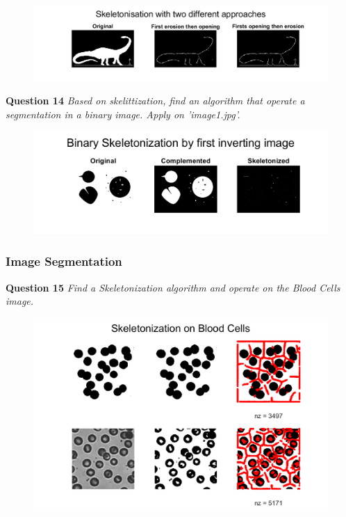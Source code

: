 \begin{figure}[H]
    \centering
    \includegraphics[width=\linewidth]{Doc/Graphics/Part2/part2_Q13.png}
\end{figure}


\textbf{Question 14} \textit{Based on skelittization, ﬁnd an algorithm that operate a segmentation in a binary image. Apply on ’image1.jpg’.}

\begin{figure}[H]
    \centering
    \includegraphics[width=\linewidth]{Doc/Graphics/Part2/part2_Q14.png}
\end{figure}



\newpage
\subsubsection{Image Segmentation}
\textbf{Question 15} \textit{Find a Skeletonization algorithm and operate on the Blood Cells image.}


\begin{figure}[H]
    \centering
    \includegraphics[width=\linewidth]{Doc/Graphics/Part2/part2_Q15.png}
\end{figure}
